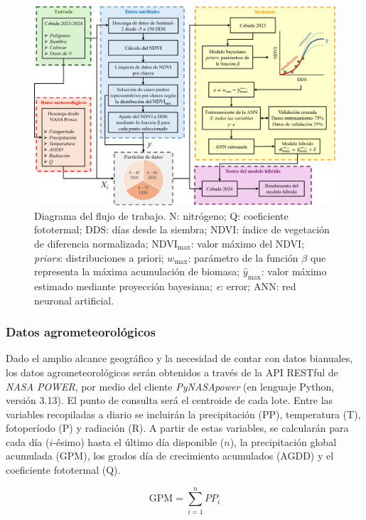 \documentclass[
11pt, %
]{charter}
\begin{document}
\begin{figure}[htpb]
\centering 
\includegraphics[width=.99\textwidth]{./Figuras/Flujo_de_Trabajo.png}
\caption{Diagrama del flujo de trabajo. N: nitrógeno; Q: coeficiente fototermal; DDS: días desde la siembra; NDVI: índice de vegetación de diferencia normalizada; NDVI$_{\max}$: valor máximo del NDVI; \emph{priors}: distribuciones a priori; $w_{\max}$: parámetro de la función $\beta$ que representa la máxima acumulación de biomasa; $\hat{y}_{\max}$: valor máximo estimado mediante proyección bayesiana; \emph{e}: error; ANN: red neuronal artificial.}

\label{fig:Flujo_de_Trabajo}
\end{figure}


\subsubsection{Datos agrometeorológicos}
\label{sec:descripcion}
Dado el amplio alcance geográfico y la necesidad de contar con datos bianuales, los datos agrometeorológicos serán obtenidos a través de la API RESTful de \textit{NASA POWER}, por medio del cliente \textit{PyNASApower} (en lenguaje Python, versión 3.13). El punto de consulta será el centroide de cada lote. Entre las variables recopiladas a diario se incluirán la precipitación (PP), temperatura (T), fotoperíodo (P) y radiación (R). A partir de estas variables, se calcularán para cada día ($i$-ésimo) hasta el último día disponible ($n$), la precipitación global acumulada (GPM), los grados día de crecimiento acumulados (AGDD) y el coeficiente fototermal (Q).

\begin{equation}
\label{eq:GPM}
\text{GPM} = \sum_{i=1}^{n} PP_{i}
\end{equation}
\end{document}
